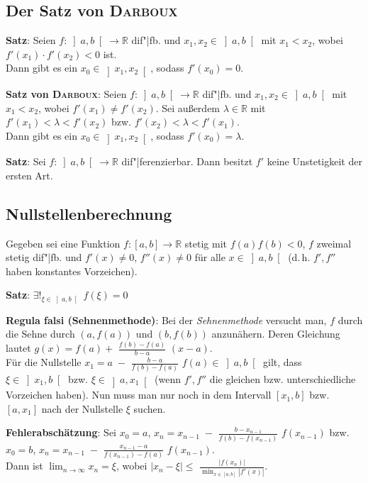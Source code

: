 \subsection{%
    Der Satz von \textsc{Darboux}%
}

\textbf{Satz}:
Seien $f: \left]a,b\right[ \rightarrow \mathbb{R}$ dif"|fb. und
$x_1, x_2 \in \left]a,b\right[$ mit $x_1 < x_2$, wobei
$f'(x_1) \cdot f'(x_2) < 0$ ist. \\
Dann gibt es ein $x_0 \in \left]x_1,x_2\right[$, sodass $f'(x_0) = 0$.

\textbf{Satz von \textsc{Darboux}}:
Seien $f: \left]a,b\right[ \rightarrow \mathbb{R}$ dif"|fb. und
$x_1, x_2 \in \left]a,b\right[$ mit $x_1 < x_2$, wobei $f'(x_1) \not= f'(x_2)$.
Sei außerdem $\lambda \in \mathbb{R}$ mit $f'(x_1) < \lambda < f'(x_2)$ bzw.
$f'(x_2) < \lambda < f'(x_1)$. \\
Dann gibt es ein $x_0 \in \left]x_1,x_2\right[$, sodass $f'(x_0) = \lambda$.

\textbf{Satz}:
Sei $f: \left]a,b\right[ \rightarrow \mathbb{R}$ dif"|ferenzierbar. \quad
Dann besitzt $f'$ keine Unstetigkeit der ersten Art.

\subsection{%
    Nullstellenberechnung%
}

Gegeben sei eine Funktion $f: [a,b] \rightarrow \mathbb{R}$ stetig mit
$f(a) f(b) < 0$, $f$ zweimal stetig dif"|fb. und $f'(x) \not= 0$,
$f''(x) \not= 0$ für alle $x \in \left]a,b\right[$ (d.\,h. $f', f''$ haben
konstantes Vorzeichen).

\textbf{Satz}: $\exists!_{\xi \in \left]a,b\right[}\; f(\xi) = 0$

\linie

\textbf{Regula falsi (Sehnenmethode)}:
Bei der \emph{Sehnenmethode} versucht man, $f$ durch die Sehne durch
$(a, f(a))$ und $(b, f(b))$ anzunähern.
Deren Gleichung lautet $g(x) = f(a) +$ {\large $\frac{f(b) - f(a)}{b - a}$}
$(x - a)$. \\
Für die Nullstelle $x_1 = a \;-$ {\large $\frac{b - a}{f(b) - f(a)}$}
$f(a) \in \left]a,b\right[$ gilt, dass $\xi \in \left]x_1,b\right[$
bzw. $\xi \in \left]a,x_1\right[$
(wenn $f', f''$ die gleichen bzw. unterschiedliche Vorzeichen haben).
Nun muss man nur noch in dem Intervall $[x_1,b]$
bzw. $[a,x_1]$ nach der Nullstelle $\xi$ suchen.

\textbf{Fehlerabschätzung}:
Sei $x_0 = a$, $x_n = x_{n-1} \;-$
{\large $\frac{b - x_{n-1}}{f(b) - f(x_{n-1})}$} $f(x_{n-1})$ bzw. \\
$x_0 = b$,
$x_n = x_{n-1} \;-$
{\large $\frac{x_{n-1} - a}{f(x_{n-1}) - f(a)}$} $f(x_{n-1})$. \\
Dann ist $\lim_{n \to \infty} x_n = \xi$, wobei
$|x_n - \xi| \le$ {\large $\frac{|f(x_n)|}{\min_{x \in [a,b]} |f'(x)|}$}.

